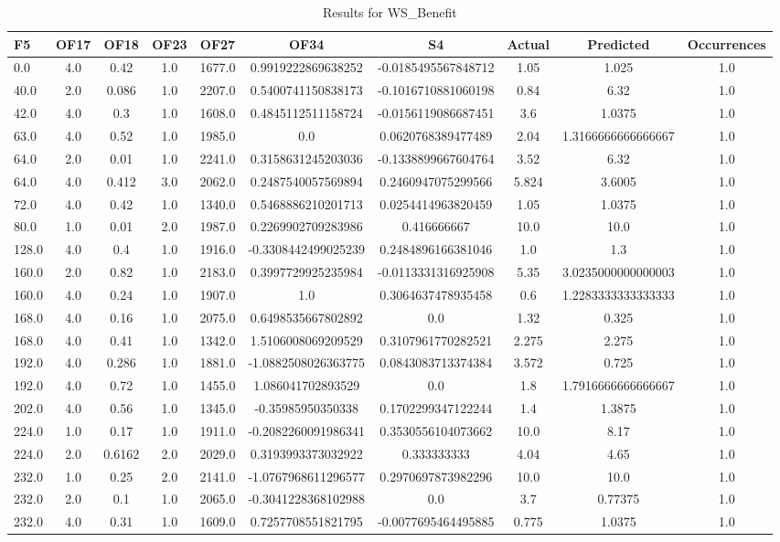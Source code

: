 \clearpage
\begin{table}[htbp]
\centering
\begin{tabular}{|l|c|c|c|c|c|c|c|c|c|}
\hline
F5 & OF17 & OF18 & OF23 & OF27 & OF34 & S4 & Actual & Predicted & Occurrences \\
\hline
0.0 & 4.0 & 0.42 & 1.0 & 1677.0 & 0.9919222869638252 & -0.0185495567848712 & 1.05 & 1.025 & 1.0 \\
40.0 & 2.0 & 0.086 & 1.0 & 2207.0 & 0.5400741150838173 & -0.1016710881060198 & 0.84 & 6.32 & 1.0 \\
42.0 & 4.0 & 0.3 & 1.0 & 1608.0 & 0.4845112511158724 & -0.0156119086687451 & 3.6 & 1.0375 & 1.0 \\
63.0 & 4.0 & 0.52 & 1.0 & 1985.0 & 0.0 & 0.0620768389477489 & 2.04 & 1.3166666666666667 & 1.0 \\
64.0 & 2.0 & 0.01 & 1.0 & 2241.0 & 0.3158631245203036 & -0.1338899667604764 & 3.52 & 6.32 & 1.0 \\
64.0 & 4.0 & 0.412 & 3.0 & 2062.0 & 0.2487540057569894 & 0.2460947075299566 & 5.824 & 3.6005 & 1.0 \\
72.0 & 4.0 & 0.42 & 1.0 & 1340.0 & 0.5468886210201713 & 0.0254414963820459 & 1.05 & 1.0375 & 1.0 \\
80.0 & 1.0 & 0.01 & 2.0 & 1987.0 & 0.2269902709283986 & 0.416666667 & 10.0 & 10.0 & 1.0 \\
128.0 & 4.0 & 0.4 & 1.0 & 1916.0 & -0.3308442499025239 & 0.2484896166381046 & 1.0 & 1.3 & 1.0 \\
160.0 & 2.0 & 0.82 & 1.0 & 2183.0 & 0.3997729925235984 & -0.0113331316925908 & 5.35 & 3.0235000000000003 & 1.0 \\
160.0 & 4.0 & 0.24 & 1.0 & 1907.0 & 1.0 & 0.3064637478935458 & 0.6 & 1.2283333333333333 & 1.0 \\
168.0 & 4.0 & 0.16 & 1.0 & 2075.0 & 0.6498535667802892 & 0.0 & 1.32 & 0.325 & 1.0 \\
168.0 & 4.0 & 0.41 & 1.0 & 1342.0 & 1.5106008069209529 & 0.3107961770282521 & 2.275 & 2.275 & 1.0 \\
192.0 & 4.0 & 0.286 & 1.0 & 1881.0 & -1.0882508026363775 & 0.0843083713374384 & 3.572 & 0.725 & 1.0 \\
192.0 & 4.0 & 0.72 & 1.0 & 1455.0 & 1.086041702893529 & 0.0 & 1.8 & 1.7916666666666667 & 1.0 \\
202.0 & 4.0 & 0.56 & 1.0 & 1345.0 & -0.35985950350338 & 0.1702299347122244 & 1.4 & 1.3875 & 1.0 \\
224.0 & 1.0 & 0.17 & 1.0 & 1911.0 & -0.2082260091986341 & 0.3530556104073662 & 10.0 & 8.17 & 1.0 \\
224.0 & 2.0 & 0.6162 & 2.0 & 2029.0 & 0.3193993373032922 & 0.333333333 & 4.04 & 4.65 & 1.0 \\
232.0 & 1.0 & 0.25 & 2.0 & 2141.0 & -1.0767968611296577 & 0.2970697873982296 & 10.0 & 10.0 & 1.0 \\
232.0 & 2.0 & 0.1 & 1.0 & 2065.0 & -0.3041228368102988 & 0.0 & 3.7 & 0.77375 & 1.0 \\
232.0 & 4.0 & 0.31 & 1.0 & 1609.0 & 0.7257708551821795 & -0.0077695464495885 & 0.775 & 1.0375 & 1.0 \\
\hline
\end{tabular}
\caption{Results for WS_Benefit}
\label{tab:WS_Benefit_results}
\end{table}
